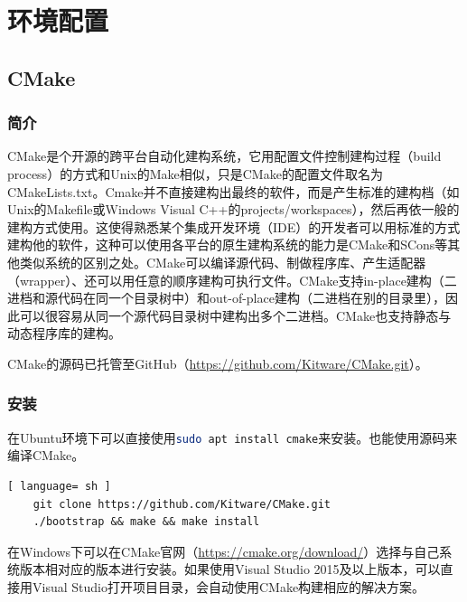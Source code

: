 \chapter{环境配置}
\section{CMake}
	\subsection{简介}
	\par CMake是个开源的跨平台自动化建构系统，它用配置文件控制建构过程（build process）的方式和Unix的Make相似，只是CMake的配置文件取名为CMakeLists.txt。Cmake并不直接建构出最终的软件，而是产生标准的建构档（如Unix的Makefile或Windows Visual C++的projects/workspaces），然后再依一般的建构方式使用。这使得熟悉某个集成开发环境（IDE）的开发者可以用标准的方式建构他的软件，这种可以使用各平台的原生建构系统的能力是CMake和SCons等其他类似系统的区别之处。CMake可以编译源代码、制做程序库、产生适配器（wrapper）、还可以用任意的顺序建构可执行文件。CMake支持in-place建构（二进档和源代码在同一个目录树中）和out-of-place建构（二进档在别的目录里），因此可以很容易从同一个源代码目录树中建构出多个二进档。CMake也支持静态与动态程序库的建构。\cite{ wiki:CMake}
	\par CMake的源码已托管至GitHub（\href{https://github.com/Kitware/CMake.git}{https://github.com/Kitware/CMake.git}）。
	\subsection{安装}
	\par 在Ubuntu环境下可以直接使用\lstinline[language=sh]{sudo apt install cmake}来安装。也能使用源码来编译CMake。
	\begin{lstlisting}[ language= sh ]
	git clone https://github.com/Kitware/CMake.git
	./bootstrap && make && make install
	\end{lstlisting}
	\par 在Windows下可以在CMake官网（\href{https://cmake.org/download/}{https://cmake.org/download/}）选择与自己系统版本相对应的版本进行安装。如果使用Visual Studio 2015及以上版本，可以直接用Visual Studio打开项目目录，会自动使用CMake构建相应的解决方案。
